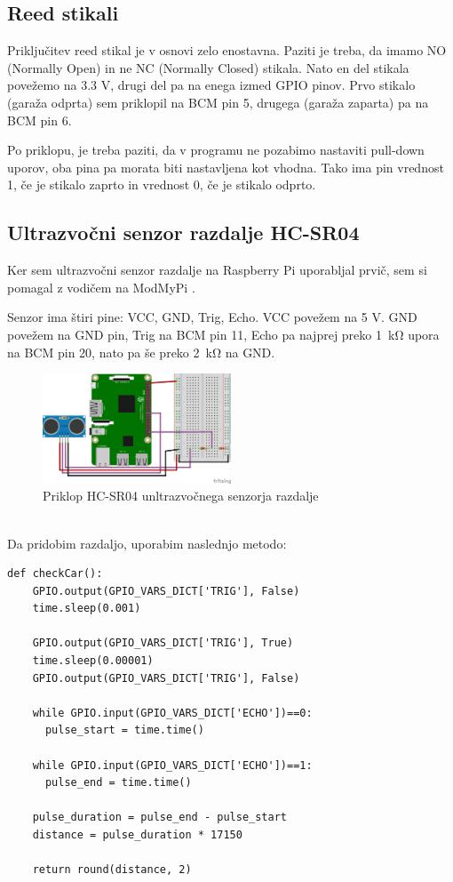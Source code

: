 \documentclass[11pt]{article}
\begin{document}
\subsection{Reed stikali}
Priključitev reed stikal je v osnovi zelo enostavna. Paziti je treba, da imamo NO (Normally Open) in ne NC (Normally Closed) stikala. Nato en del stikala povežemo na 3.3 V, drugi del pa na enega izmed GPIO pinov. Prvo stikalo (garaža odprta) sem priklopil na BCM pin 5, drugega (garaža zaparta) pa na BCM pin 6.

Po priklopu, je treba paziti, da v programu ne pozabimo nastaviti pull-down uporov, oba pina pa morata biti nastavljena kot vhodna. Tako ima pin vrednost 1, če je stikalo zaprto in vrednost 0, če je stikalo odprto.

\subsection{Ultrazvočni senzor razdalje HC-SR04}
Ker sem ultrazvočni senzor razdalje na Raspberry Pi uporabljal prvič, sem si pomagal z vodičem na ModMyPi \cite{ModMyPi_us}.

Senzor ima štiri pine: VCC, GND, Trig, Echo. VCC povežem na 5 V. GND povežem na GND pin, Trig na BCM pin 11, Echo pa najprej preko \SI{1}{\kohm} upora na BCM pin 20, nato pa še preko \SI{2}{\kohm} na GND.
\begin{figure}[h]
\centering
\includegraphics[width=0.5\textwidth]{images/smartGarage_Distance_bb.png}
\caption{Priklop HC-SR04 unltrazvočnega senzorja razdalje}
\end{figure}\\
Da pridobim razdaljo, uporabim naslednjo metodo:
\begin{verbatim}
def checkCar():
    GPIO.output(GPIO_VARS_DICT['TRIG'], False)
    time.sleep(0.001)

    GPIO.output(GPIO_VARS_DICT['TRIG'], True)
    time.sleep(0.00001)
    GPIO.output(GPIO_VARS_DICT['TRIG'], False)

    while GPIO.input(GPIO_VARS_DICT['ECHO'])==0:
      pulse_start = time.time()

    while GPIO.input(GPIO_VARS_DICT['ECHO'])==1:
      pulse_end = time.time()

    pulse_duration = pulse_end - pulse_start
    distance = pulse_duration * 17150

    return round(distance, 2)
\end{verbatim}
\newpage
\end{document}
